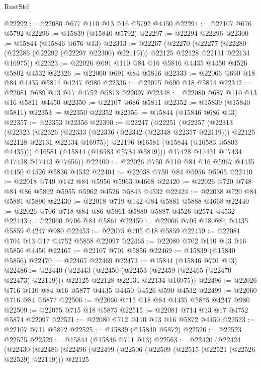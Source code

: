 \begin{lexlean}{RustStd}
\begin{coremodule}
@22292 := @22080 @677 @110 @13 @16 @5792 @4450
@22294 := @22107 @676 @5792
@22296 := @15839 (@15840 @5792)
@22297 := @22294 @22296
@22300 := @15844 (@15846 @676 @13)
@22313 := @22267
    (@22270
      (@22277 (@22280 (@22286 (@22292 (@22297 @22300) @22119))) @22125 @22128 @22131 @22134 @16975))
@22323 := @22026 @691 @110 @84 @16 @5816 @4435 @4450 @4526 @5802 @4532
@22326 := @22060 @691 @84 @5816
@22333 := @22066 @690 @18 @84 @4435 @5814 @4247 @980
@22336 := @22075 @690 @18 @5814
@22342 := @22081 @689 @13 @17 @4752 @5813 @22097
@22348 := @22080 @687 @110 @13 @16 @5811 @4450
@22350 := @22107 @686 @5811
@22352 := @15839 (@15840 @5811)
@22353 := @22350 @22352
@22356 := @15844 (@15846 @686 @13)
@22357 := @22353 @22356
@22390 := @22247
    (@22251
      (@22257
        (@22313
          (@22323
            (@22326
              (@22333 (@22336 (@22342 (@22348 @22357 @22119))) @22125 @22128 @22131 @22134 @16975))
            @22196
            @16581
            (@15844 (@16583 @5803 @4435)))
          @16581
          (@15844 (@16583 @5784 @5819)))
        @17428
        @17431
        @17434
        @17438
        @17443
        @17656))
@22400 := @22026 @750 @110 @84 @16 @5967 @4435 @4450 @4526 @5836 @4532
@22404 := @22038 @750 @84 @5956 @5965
@22410 := @22018 @749 @142 @84 @5956 @5963 @4668
@22420 := @22026 @720 @748 @84 @86 @5892 @5955 @5962 @4526 @5843 @4532
@22424 := @22038 @720 @84 @5881 @5890
@22430 := @22018 @719 @142 @84 @5881 @5888 @4668
@22440 := @22026 @706 @718 @84 @86 @5861 @5880 @5887 @4526 @2574 @4532
@22443 := @22060 @706 @84 @5861
@22450 := @22066 @705 @18 @84 @4435 @5859 @4247 @980
@22453 := @22075 @705 @18 @5859
@22459 := @22081 @704 @13 @17 @4752 @5858 @22097
@22465 := @22080 @702 @110 @13 @16 @5856 @4450
@22467 := @22107 @701 @5856
@22469 := @15839 (@15840 @5856)
@22470 := @22467 @22469
@22473 := @15844 (@15846 @701 @13)
@22486 := @22440
    (@22443
      (@22450 (@22453 (@22459 (@22465 (@22470 @22473) @22119))) @22125 @22128 @22131 @22134 @16975))
@22496 := @22026 @716 @110 @84 @16 @5877 @4435 @4450 @4526 @590 @4532
@22499 := @22060 @716 @84 @5877
@22506 := @22066 @715 @18 @84 @4435 @5875 @4247 @980
@22509 := @22075 @715 @18 @5875
@22515 := @22081 @714 @13 @17 @4752 @5874 @22097
@22521 := @22080 @712 @110 @13 @16 @5872 @4450
@22523 := @22107 @711 @5872
@22525 := @15839 (@15840 @5872)
@22526 := @22523 @22525
@22529 := @15844 (@15846 @711 @13)
@22563 := @22420
    (@22424
      (@22430
        (@22486
          (@22496
            (@22499
              (@22506
                (@22509 (@22515 (@22521 (@22526 @22529) @22119)))
                @22125

\end{coremodule}
\end{lexlean}
